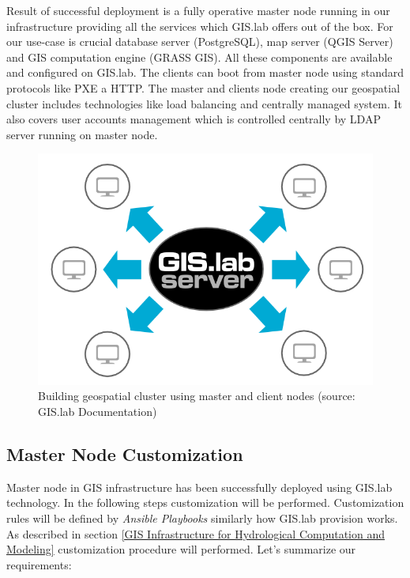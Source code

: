 \documentclass{isprs}
\begin{document}
Result of successful deployment is a fully operative master node
running in our infrastructure providing all the services which GIS.lab
offers out of the box. For our use-case is crucial database server
(PostgreSQL), map server (QGIS Server) and GIS computation engine
(GRASS GIS). All these components are available and configured on
GIS.lab. The clients can boot from master node using standard
protocols like PXE a HTTP. The master and clients node creating our
geospatial cluster includes technologies like load balancing and
centrally managed system. It also covers user accounts management
which is controlled centrally by LDAP server running on master node.

\begin{figure}[ht!]
\begin{center}
  \includegraphics[width=1.0\columnwidth]{figures/gislab-machines-launch.png}
  \caption{Building geospatial cluster using master and client nodes
    (source: GIS.lab Documentation)}
\label{fig:gislab_infrastructure}
\end{center}
\end{figure}

\subsection{Master Node Customization}

Master node in GIS infrastructure has been successfully deployed using
GIS.lab technology. In the following steps customization will be
performed. Customization rules will be defined by \textit{Ansible
  Playbooks} similarly how GIS.lab provision works. As described in
section \ref{GIS Infrastructure for Hydrological Computation and
  Modeling} customization procedure will performed. Let's summarize
our requirements:
\end{document}

